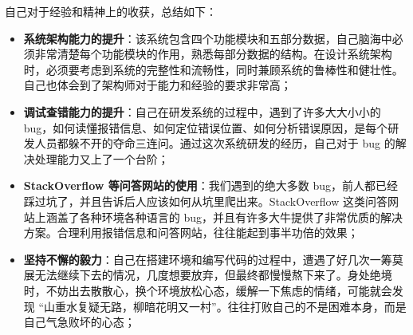\documentclass{ctexart}
\begin{document}
    自己对于经验和精神上的收获，总结如下：

    \begin{itemize}
        \item \textbf{系统架构能力的提升}：该系统包含四个功能模块和五部分数据，自己脑海中必须非常清楚每个功能模块的作用，熟悉每部分数据的结构。在设计系统架构时，必须要考虑到系统的完整性和流畅性，同时兼顾系统的鲁棒性和健壮性。自己也体会到了架构师对于能力和经验的要求非常高；
        \item \textbf{调试查错能力的提升}：自己在研发系统的过程中，遇到了许多大大小小的 bug，如何读懂报错信息、如何定位错误位置、如何分析错误原因，是每个研发人员都躲不开的夺命三连问。通过这次系统研发的经历，自己对于 bug 的解决处理能力又上了一个台阶；
        \item \textbf{StackOverflow 等问答网站的使用}：我们遇到的绝大多数 bug，前人都已经踩过坑了，并且告诉后人应该如何从坑里爬出来。StackOverflow 这类问答网站上涵盖了各种环境各种语言的 bug，并且有许多大牛提供了非常优质的解决方案。合理利用报错信息和问答网站，往往能起到事半功倍的效果；
        \item \textbf{坚持不懈的毅力}：自己在搭建环境和编写代码的过程中，遭遇了好几次一筹莫展无法继续下去的情况，几度想要放弃，但最终都慢慢熬下来了。身处绝境时，不妨出去散散心，换个环境放松心态，缓解一下焦虑的情绪，可能就会发现 “山重水复疑无路，柳暗花明又一村”。往往打败自己的不是困难本身，而是自己气急败坏的心态；
    \end{itemize}


    
    
\end{document}
